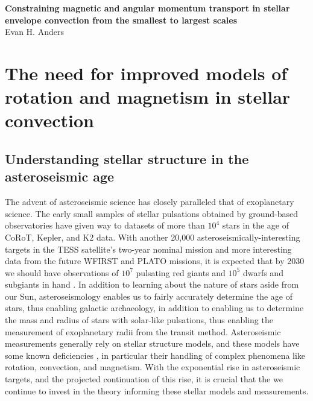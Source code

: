 \documentclass[aasms,12pt]{article}
\begin{document}
\begin{center}
   \large\textbf{Constraining magnetic and angular momentum transport in stellar envelope convection from the smallest to largest scales}\\
   \vspace{0.2cm}
   \large{Evan H. Anders}\\
   \vspace{0.2cm}
\end{center}

\vspace{-0.6cm}

\section{The need for improved models of rotation and magnetism in stellar convection}

\subsection{Understanding stellar structure in the asteroseismic age}
The advent of asteroseismic science has closely paralleled that of exoplanetary science.
The early small samples of stellar pulsations obtained by ground-based observatories \citep[e.g.,][and others]{kjeldsen&frandsen1991, bouchy&carrier2001, bedding&all2001} have given way to datasets of more than $10^4$ stars \citep[e.g.,][]{yu&all2018, santos&all2019b} in the age of CoRoT, Kepler, and K2 data.
With another 20,000 asteroseismically-interesting targets in the TESS satellite's two-year nominal mission \citep{schofield&all2019} and more interesting data from the future WFIRST and PLATO missions, it is expected that by 2030 we should have observations of $10^7$ pulsating red giants and $10^5$ dwarfs and subgiants in hand  \citep{huber&all2019}.
In addition to learning about the nature of stars aside from our Sun, asteroseismology enables us to fairly accurately determine the age of stars, thus enabling galactic archaeology, in addition to enabling us to determine the mass and radius of stars with solar-like pulsations, thus enabling the measurement of exoplanetary radii from the transit method.
Asteroseismic measurements generally rely on stellar structure models, and these models have some known deficiencies \citep{buldgen2019}, in particular their handling of complex phenomena like rotation, convection, and magnetism.
With the exponential rise in asteroseismic targets, and the projected continuation of this rise, it is crucial that the we continue to invest in the theory informing these stellar models and measurements.
\end{document}
